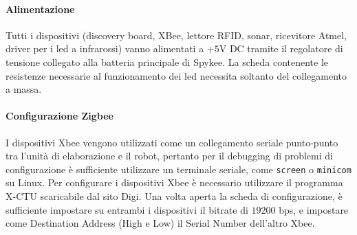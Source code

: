 \paragraph{Alimentazione} Tutti i dispositivi (discovery board, XBee, lettore RFID, sonar, ricevitore Atmel, driver per i led a infrarossi) vanno alimentati a $+5$V DC tramite il regolatore di tensione collegato alla batteria principale di Spykee. La scheda contenente le resistenze necessarie al funzionamento dei led necessita soltanto del collegamento a massa.

\paragraph{Configurazione Zigbee} I dispositivi Xbee vengono utilizzati come un collegamento seriale punto-punto tra l'unità di elaborazione e il robot, pertanto per il debugging di problemi di configurazione è sufficiente utilizzare un terminale seriale, come \verb|screen| o \verb|minicom| su Linux. Per configurare i dispositivi Xbee è necessario utilizzare il programma X-CTU scaricabile dal sito Digi. Una volta aperta la scheda di configurazione, è sufficiente impostare su entrambi i dispositivi il bitrate di $19200$ bps, e impostare come Destination Address (High e Low) il Serial Number dell'altro Xbee.
